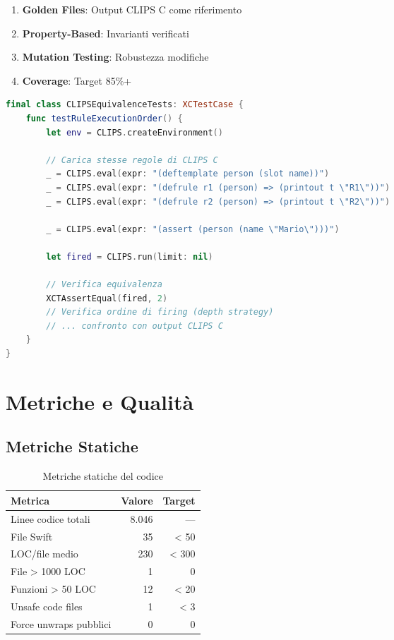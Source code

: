 \begin{enumerate}
\item \textbf{Golden Files}: Output CLIPS C come riferimento
\item \textbf{Property-Based}: Invarianti verificati
\item \textbf{Mutation Testing}: Robustezza modifiche
\item \textbf{Coverage}: Target 85\%+
\end{enumerate}

\begin{lstlisting}[language=Swift]
final class CLIPSEquivalenceTests: XCTestCase {
    func testRuleExecutionOrder() {
        let env = CLIPS.createEnvironment()
        
        // Carica stesse regole di CLIPS C
        _ = CLIPS.eval(expr: "(deftemplate person (slot name))")
        _ = CLIPS.eval(expr: "(defrule r1 (person) => (printout t \"R1\"))")
        _ = CLIPS.eval(expr: "(defrule r2 (person) => (printout t \"R2\"))")
        
        _ = CLIPS.eval(expr: "(assert (person (name \"Mario\")))")
        
        let fired = CLIPS.run(limit: nil)
        
        // Verifica equivalenza
        XCTAssertEqual(fired, 2)
        // Verifica ordine di firing (depth strategy)
        // ... confronto con output CLIPS C
    }
}
\end{lstlisting}

\section{Metriche e Qualità}

\subsection{Metriche Statiche}

\begin{table}[h]
\centering
\begin{tabular}{@{}lrr@{}}
\toprule
\textbf{Metrica} & \textbf{Valore} & \textbf{Target} \\
\midrule
Linee codice totali & 8.046 & --- \\
File Swift & 35 & < 50 \\
LOC/file medio & 230 & < 300 \\
File > 1000 LOC & 1 & 0 \\
Funzioni > 50 LOC & 12 & < 20 \\
Unsafe code files & 1 & < 3 \\
Force unwraps pubblici & 0 & 0 \\
\bottomrule
\end{tabular}
\caption{Metriche statiche del codice}
\label{tab:static_metrics}
\end{table}

